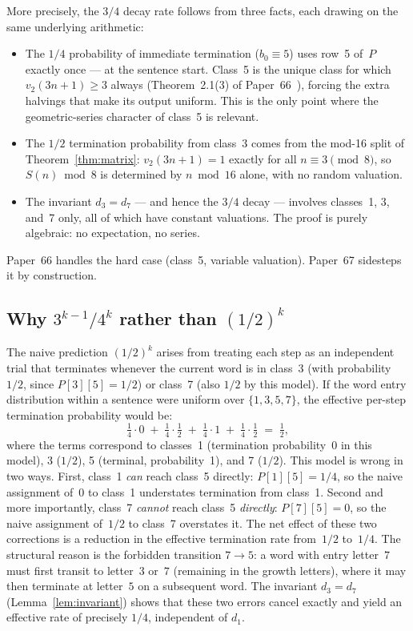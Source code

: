 \documentclass[12pt]{article}
\theoremstyle{definition}
\theoremstyle{remark}
\newcommand{\vt}{v_2}
\newcommand{\Sm}{S}
\begin{document}
More precisely, the $3/4$ decay rate follows from three facts, each drawing
on the same underlying arithmetic:
\begin{itemize}
  \item The $1/4$ probability of immediate termination ($b_0 \equiv 5$)
        uses row~5 of~$P$ exactly once — at the sentence start.
        Class~5 is the unique class for which $\vt(3n+1) \geq 3$ always
        (Theorem~2.1(3) of Paper~66~\cite{paper66}), forcing
        the extra halvings that make its output uniform.
        This is the only point where the geometric-series character of
        class~5 is relevant.
  \item The $1/2$ termination probability from class~3 comes from the mod-16
        split of Theorem~\ref{thm:matrix}: $\vt(3n+1) = 1$ exactly for all
        $n \equiv 3 \pmod 8$, so $\Sm(n) \bmod 8$ is determined by $n \bmod 16$
        alone, with no random valuation.
  \item The invariant $d_3 = d_7$ — and hence the $3/4$ decay — involves
        classes~1, 3, and~7 only, all of which have constant valuations.
        The proof is purely algebraic: no expectation, no series.
\end{itemize}
Paper~66 handles the hard case (class~5, variable valuation).
Paper~67 sidesteps it by construction.

\subsection{Why $3^{k-1}/4^k$ rather than $(1/2)^k$}

The naive prediction $(1/2)^k$ arises from treating each step as an
independent trial that terminates whenever the current word is in class~3
(with probability~$1/2$, since $P[3][5] = 1/2$) or class~7 (also $1/2$
by this model).
If the word entry distribution within a sentence were uniform over $\{1,3,5,7\}$, the
effective per-step termination probability would be:
\[
  \tfrac{1}{4}\cdot 0 \;+\; \tfrac{1}{4}\cdot\tfrac{1}{2}
  \;+\; \tfrac{1}{4}\cdot 1 \;+\; \tfrac{1}{4}\cdot\tfrac{1}{2}
  \;=\; \tfrac{1}{2},
\]
where the terms correspond to classes~1 (termination probability~0 in this model),
3 ($1/2$), 5 (terminal, probability~1), and 7 ($1/2$).
This model is wrong in two ways.
First, class~1 \emph{can} reach class~5 directly: $P[1][5] = 1/4$,
so the naive assignment of~0 to class~1 understates termination from class~1.
Second and more importantly, class~7 \emph{cannot} reach class~5 \emph{directly}:
$P[7][5] = 0$, so the naive assignment of~$1/2$ to class~7 overstates it.
The net effect of these two corrections is a reduction in the effective
termination rate from~$1/2$ to~$1/4$.
The structural reason is the forbidden transition $7 \to 5$:
a word with entry letter~$7$ must first transit to letter~$3$ or~$7$ (remaining in
the growth letters), where it may then terminate at letter~$5$ on a subsequent word.
The invariant $d_3 = d_7$ (Lemma~\ref{lem:invariant}) shows that
these two errors cancel exactly and yield an effective rate of precisely
$1/4$, independent of $d_1$.
\end{document}
